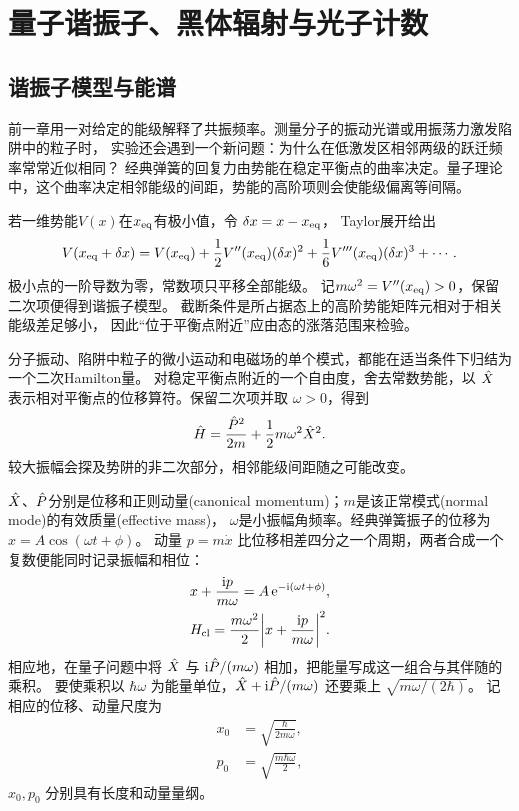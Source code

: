 \chapter{量子谐振子、黑体辐射与光子计数}
\label{ch:oscillator}

\section{谐振子模型与能谱}
前一章用一对给定的能级解释了共振频率。测量分子的振动光谱或用振荡力激发陷阱中的粒子时，
实验还会遇到一个新问题：为什么在低激发区相邻两级的跃迁频率常常近似相同？
经典弹簧的回复力由势能在稳定平衡点的曲率决定。量子理论中，这个曲率决定相邻能级的间距，势能的高阶项则会使能级偏离等间隔。

若一维势能$V(x)$在$x_{\mathrm{eq}}$有极小值，令 $\delta x = x - x_{\mathrm{eq}}$，
Taylor展开给出
\begin{equation}
    V(x_{\mathrm{eq}} + \delta x)
    = V(x_{\mathrm{eq}}) + \frac12V''(x_{\mathrm{eq}})(\delta x)^2
        + \frac16V'''(x_{\mathrm{eq}})(\delta x)^3 + \cdots.
\end{equation}
极小点的一阶导数为零，常数项只平移全部能级。
记$m\omega^2 = V''(x_{\mathrm{eq}}) > 0$，保留二次项便得到谐振子模型。
截断条件是所占据态上的高阶势能矩阵元相对于相关能级差足够小，
因此“位于平衡点附近”应由态的涨落范围来检验。

分子振动、陷阱中粒子的微小运动和电磁场的单个模式，都能在适当条件下归结为一个二次Hamilton量。
对稳定平衡点附近的一个自由度，舍去常数势能，以 $\hat{X}$ 表示相对平衡点的位移算符。保留二次项并取 $\omega > 0$，得到
\begin{equation}
    \hat{H} = \frac{\hat{P}^2}{2m} + \frac12m\omega^2\hat{X}^2.
\end{equation}
较大振幅会探及势阱的非二次部分，相邻能级间距随之可能改变。

$\hat{X}$、$\hat{P}$分别是位移和正则动量(canonical momentum)；$m$是该正常模式(normal mode)的有效质量(effective mass)，
$\omega$是小振幅角频率。经典弹簧振子的位移为 $x = A\cos(\omega t + \phi)$。
动量 $p = m\dot x$ 比位移相差四分之一个周期，两者合成一个复数便能同时记录振幅和相位：
\begin{subequations}
    \begin{gather}
        x + \frac{\mathrm{i} p}{m\omega} = A\mathop{}\!\mathrm{e}^{-\mathrm{i}(\omega t+\phi)},\\
        H_{\mathrm{cl}} = \frac{m\omega^2}{2}
            \biggl\lvert x + \frac{\mathrm{i} p}{m\omega}\biggr\rvert^2 .
    \end{gather}
\end{subequations}
相应地，在量子问题中将 $\hat{X}$ 与 $\mathrm{i} \hat{P}/(m\omega)$ 相加，把能量写成这一组合与其伴随的乘积。
要使乘积以 $\hbar\omega$ 为能量单位，$\hat{X} + \mathrm{i}\hat{P}/(m\omega)$ 还要乘上 $\sqrt{m\omega/(2\hbar)}$。
记相应的位移、动量尺度为
\begin{subequations}
    \begin{align}
        x_0 &= \sqrt{\frac{\hbar}{2m\omega}},\\
        p_0 &= \sqrt{\frac{m\hbar\omega}{2}},
    \end{align}
\end{subequations}
$x_0, p_0$ 分别具有长度和动量量纲。

